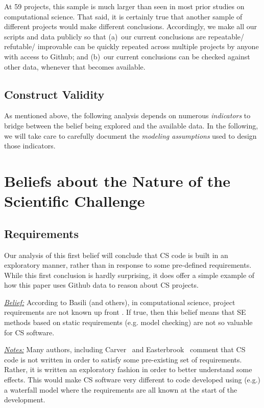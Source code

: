 \documentclass[sigconf]{acmart}
\begin{document}
At 59 projects, this sample is much larger than seen in
most prior studies on computational
science. That said, it is certainly true that another sample of different projects would make different conclusions.
Accordingly, we make all our scripts and data publicly so that
(a)~our current conclusions
are repeatable/ refutable/ improvable can be quickly repeated across multiple projects by anyone with access to Github; and (b)~our current conclusions can be checked against other data, whenever that becomes available.


\subsection{Construct Validity}
As mentioned above, the following analysis depends on numerous {\em indicators} to bridge between the belief being explored and the available data. 
In the following,  we will take care to carefully document
the {\em modeling assumptions} used to design those indicators.

\section{Beliefs about the Nature of the Scientific Challenge}



\subsection{Requirements}\label{rments}


Our analysis of this first belief will conclude that
CS code is built in an exploratory manner,
rather than in response to some pre-defined
requirements. While this first conclusion is hardly
surprising, it does offer a simple example
of how this paper uses Github
data to reason about CS projects.



\noindent \textit{\underline{Belief:}} According to Basili (and others), in computational science,
project requirements are not known up front \cite{segal08_ss, carver07_environment, segal05_ss, basili08_hpc, easterbrook_cs}.
If true, then this belief means that SE methods based on 
static requirements (e.g. model checking) are not so valuable
for CS software.





\noindent \textit{\underline{Notes:}} 
Many authors, including Carver~\cite{carver07_environment}
and Easterbrook~\cite{easterbrook_cs}
comment that CS code is not written in order
to satisfy some pre-existing set of requirements.
Rather, it is written an exploratory fashion in order
to better understand some effects. 
This would make CS software very different to code developed using (e.g.) a waterfall model where the requirements
are all known at the start of the development.
\end{document}
